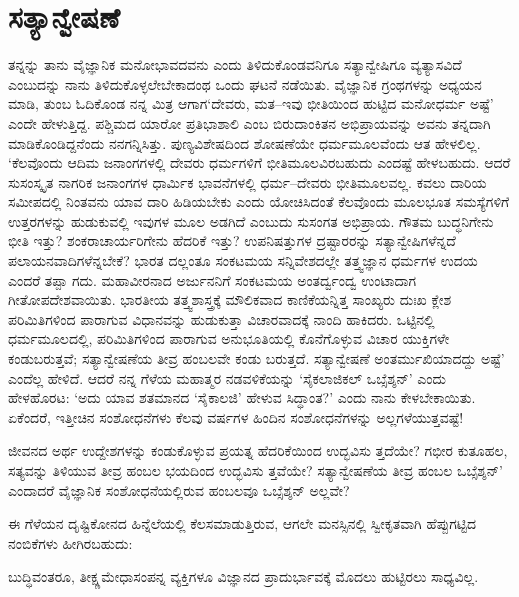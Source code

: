\section*{ಸತ್ಯಾನ್ವೇಷಣೆ}


ತನ್ನನ್ನು ತಾನು ವೈಜ್ಞಾನಿಕ ಮನೋಭಾವದವನು ಎಂದು ತಿಳಿದುಕೊಂಡವನಿಗೂ ಸತ್ಯಾನ್ವೇಷಿಗೂ ವ್ಯತ್ಯಾಸವಿದೆ ಎಂಬುದನ್ನು ನಾನು ತಿಳಿದುಕೊಳ್ಳಲೇಬೇಕಾದಂಥ ಒಂದು ಘಟನೆ ನಡೆಯಿತು. ವೈಜ್ಞಾನಿಕ ಗ್ರಂಥಗಳನ್ನು ಅಧ್ಯಯನ ಮಾಡಿ, ತುಂಬ ಓದಿಕೊಂಡ ನನ್ನ ಮಿತ್ರ ಆಗಾಗ\break ‘ದೇವರು, ಮತ–ಇವು ಭೀತಿಯಿಂದ ಹುಟ್ಟಿದ ಮನೋಧರ್ಮ ಅಷ್ಟೆ’ ಎಂದೇ ಹೇಳುತ್ತಿದ್ದ. ಪಶ್ಚಿಮದ ಯಾರೋ ಪ್ರತಿಭಾಶಾಲಿ ಎಂಬ ಬಿರುದಾಂಕಿತನ ಅಭಿಪ್ರಾಯವನ್ನು ಅವನು ತನ್ನದಾಗಿ ಮಾಡಿಕೊಂಡಿದ್ದನೆಂದು ನನಗನ್ನಿಸಿತ್ತು. ಪುಣ್ಯವಿಶೇಷದಿಂದ ಶೋಷಣೆಯೇ ಧರ್ಮ\break ಮೂಲವೆಂದು ಆತ ಹೇಳಲಿಲ್ಲ. ‘ಕೆಲವೊಂದು ಆದಿಮ ಜನಾಂಗಗಳಲ್ಲಿ ದೇವರು ಧರ್ಮಗಳಿಗೆ ಭೀತಿಮೂಲವಿರಬಹುದು ಎಂದಷ್ಟೆ ಹೇಳಬಹುದು. ಆದರೆ ಸುಸಂಸ್ಕೃತ ನಾಗರಿಕ ಜನಾಂಗಗಳ ಧಾರ್ಮಿಕ ಭಾವನೆಗಳಲ್ಲಿ ಧರ್ಮ–ದೇವರು ಭೀತಿಮೂಲವಲ್ಲ. ಕವಲು ದಾರಿಯ ಸಮೀಪದಲ್ಲಿ ನಿಂತವನು ಯಾವ ದಾರಿ ಹಿಡಿಯಬೇಕು ಎಂದು ಯೋಚಿಸಿದಂತೆ ಕೆಲವೊಂದು ಮೂಲಭೂತ ಸಮಸ್ಯೆಗಳಿಗೆ ಉತ್ತರಗಳನ್ನು ಹುಡುಕುವಲ್ಲಿ ಇವುಗಳ ಮೂಲ ಅಡಗಿದೆ ಎಂಬುದು ಸುಸಂಗತ ಅಭಿಪ್ರಾಯ. ಗೌತಮ ಬುದ್ಧನಿಗೇನು ಭೀತಿ ಇತ್ತು? ಶಂಕರಾಚಾರ್ಯರಿಗೇನು ಹೆದರಿಕೆ ಇತ್ತು? ಉಪನಿಷತ್ತುಗಳ ದ್ರಷ್ಟಾರರನ್ನು ಸತ್ಯಾನ್ವೇಷಿಗಳೆನ್ನದೆ ಪಲಾಯನವಾದಿಗಳೆನ್ನಬೇಕೆ? ಭಾರತ ದಲ್ಲಂತೂ ಸಂಕಟಮಯ ಸನ್ನಿವೇಶದಲ್ಲೇ ತತ್ತ್ವಜ್ಞಾನ ಧರ್ಮಗಳ ಉದಯ ಎಂದರೆ ತಪ್ಪಾ ಗದು. ಮಹಾವೀರನಾದ ಅರ್ಜುನನಿಗೆ ಸಂಕಟಮಯ ಅಂತರ್ದ್ವಂದ್ವ ಉಂಟಾದಾಗ ಗೀತೋಪದೇಶ\-ವಾಯಿತು. ಭಾರತೀಯ ತತ್ತ್ವಶಾಸ್ತ್ರಕ್ಕೆ ಮೌಲಿಕವಾದ ಕಾಣಿಕೆಯನ್ನಿತ್ತ ಸಾಂಖ್ಯರು ದುಃಖ ಕ್ಲೇಶ ಪರಿಮಿತಿಗಳಿಂದ ಪಾರಾಗುವ ವಿಧಾನವನ್ನು ಹುಡುಕುತ್ತಾ ವಿಚಾರವಾದಕ್ಕೆ ನಾಂದಿ ಹಾಕಿದರು. ಒಟ್ಟಿನಲ್ಲಿ ಧರ್ಮಮೂಲದಲ್ಲಿ, ಪರಿಮಿತಿಗಳಿಂದ ಪಾರಾಗುವ ಅನುಭೂತಿಯಲ್ಲಿ ಕೊನೆಗೊಳ್ಳುವ ವಿಚಾರ ಯುಕ್ತಿಗಳೇ ಕಂಡುಬರುತ್ತವೆ; ಸತ್ಯಾನ್ವೇಷಣೆಯ ತೀವ್ರ ಹಂಬಲವೇ ಕಂಡು ಬರುತ್ತದೆ. ಸತ್ಯಾನ್ವೇಷಣೆ ಅಂತರ್ಮುಖಿಯಾದದ್ದು ಅಷ್ಟೆ’ ಎಂದೆಲ್ಲ ಹೇಳಿದೆ. ಆದರೆ ನನ್ನ ಗೆಳೆಯ ಮಹಾತ್ಮರ ನಡವಳಿಕೆಯನ್ನು ‘ಸೈಕಲಾಜಿಕಲ್ ಒಬ್ಸೆಶ್ಶನ್​’ ಎಂದು ಹೇಳಹೊರಟ: ‘ಅದು ಯಾವ ಶತಮಾನದ ‘ಸೈಕಾಲಜಿ’ ಹೇಳುವ ಸಿದ್ಧಾಂತ?’ ಎಂದು ನಾನು ಕೇಳಬೇಕಾಯಿತು. ಏಕೆಂದರೆ, ಇತ್ತೀಚಿನ ಸಂಶೋಧನೆಗಳು ಕೆಲವು ವರ್ಷಗಳ ಹಿಂದಿನ ಸಂಶೋಧನೆಗಳನ್ನು ಅಲ್ಲಗಳೆಯುತ್ತವಷ್ಟೆ!

\vskip 1.4pt

ಜೀವನದ ಅರ್ಥ ಉದ್ದೇಶಗಳನ್ನು ಕಂಡುಕೊಳ್ಳುವ ಪ್ರಯತ್ನ ಹೆದರಿಕೆಯಿಂದ ಉದ್ಭವಿಸು ತ್ತದೆಯೇ? ಗಭೀರ ಕುತೂಹಲ, ಸತ್ಯವನ್ನು ತಿಳಿಯುವ ತೀವ್ರ ಹಂಬಲ ಭಯದಿಂದ ಉದ್ಭವಿಸು ತ್ತವೆಯೇ? ಸತ್ಯಾನ್ವೇಷಣೆಯ ತೀವ್ರ ಹಂಬಲ ಒಬ್ಸೆಶ್ಶನ್​’ ಎಂದಾದರೆ ವೈಜ್ಞಾನಿಕ ಸಂಶೋಧನೆ\-ಯಲ್ಲಿರುವ ಹಂಬಲವೂ ಒಬ್ಸೆಶ್ಶನ್ ಅಲ್ಲವೇ?

\vskip 1.4pt

ಈ ಗೆಳೆಯನ ದೃಷ್ಟಿಕೋನದ ಹಿನ್ನೆಲೆಯಲ್ಲಿ ಕೆಲಸಮಾಡುತ್ತಿರುವ, ಆಗಲೇ ಮನಸ್ಸಿನಲ್ಲಿ ಸ್ವೀಕೃತವಾಗಿ ಹೆಪ್ಪುಗಟ್ಟಿದ ನಂಬಿಕೆಗಳು ಹೀಗಿರಬಹುದು:

\vskip 1.4pt

ಬುದ್ಧಿವಂತರೂ, ತೀಕ್ಷ್ಣಮೇಧಾಸಂಪನ್ನ ವ್ಯಕ್ತಿಗಳೂ ವಿಜ್ಞಾನದ ಪ್ರಾದುರ್ಭಾವಕ್ಕೆ ಮೊದಲು ಹುಟ್ಟಿರಲು ಸಾಧ್ಯವಿಲ್ಲ.

